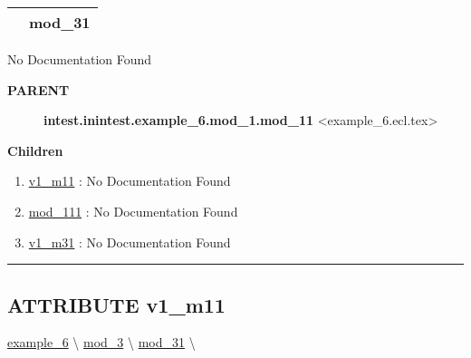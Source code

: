 {\renewcommand{\arraystretch}{1.5}
\begin{tabularx}{\textwidth}{|>{\raggedright\arraybackslash}l|X|}
\hline
\hspace{0pt}\mytexttt{\color{red} } & \textbf{mod\_31} \\
\hline
\end{tabularx}
}

\par





No Documentation Found










\par
\begin{description}
\item [\colorbox{tagtype}{\color{white} \textbf{\textsf{PARENT}}}] \textbf{intest.inintest.example\_6.mod\_1.mod\_11} <example\_6.ecl.tex>
\end{description}


\textbf{Children}
\begin{enumerate}
\item \hyperlink{ecldoc:intest.inintest.example_6.mod_1.mod_11.v1_m11}{v1\_m11}
: No Documentation Found
\item \hyperlink{ecldoc:intest.inintest.example_6.mod_1.mod_11.mod_111}{mod\_111}
: No Documentation Found
\item \hyperlink{ecldoc:intest.inintest.example_6.mod_3.mod_31.v1_m31}{v1\_m31}
: No Documentation Found
\end{enumerate}

\rule{\linewidth}{0.5pt}

\subsection*{\textsf{\colorbox{headtoc}{\color{white} ATTRIBUTE}
v1\_m11}}

\hypertarget{ecldoc:intest.inintest.example_6.mod_1.mod_11.v1_m11}{}
\hspace{0pt} \hyperlink{ecldoc:intest.inintest.example_6}{example_6} \textbackslash 
\hspace{0pt} \hyperlink{ecldoc:intest.inintest.example_6.mod_3}{mod_3} \textbackslash 
\hspace{0pt} \hyperlink{ecldoc:intest.inintest.example_6.mod_3.mod_31}{mod_31} \textbackslash 

